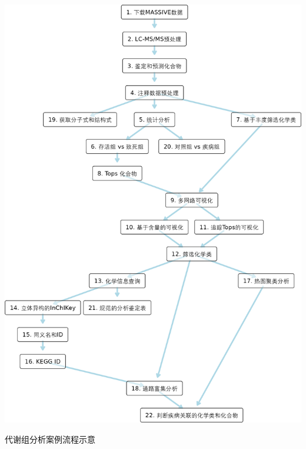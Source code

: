 \documentclass[
]{article}
\begin{document}
\bgroup {}
\includegraphics[width=25.14in]{thesis_fig/analysis_case2} \caption{代谢组分析案例流程示意}\label{fig:case2}
\makeatletter \egroup
\end{document}
